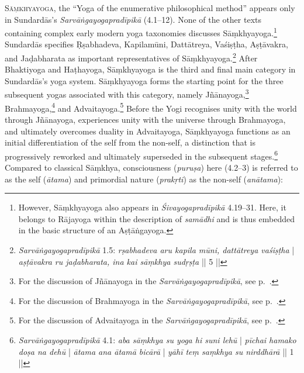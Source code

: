 \lettrine{S}{āṃkhyayoga}, the ``Yoga of the enumerative philosophical method'' appears only in Sundardās's \textit{Sarvāṅgayogapradīpikā} (4.1–12). None of the other texts containing complex early modern yoga taxonomies discusses Sāṃkhyayoga.\footnote{However, Sāṃkhyayoga also appears in \emph{Śivayogapradīpikā} 4.19–31. Here, it belongs to Rājayoga within the description of \textit{samādhi} and is thus embedded in the basic structure of an Aṣṭāṅgayoga.} Sundardās specifies Ṛṣabhadeva, Kapilamūni, Dattātreya, Vaśiṣṭha, Aṣṭāvakra, and Jaḍabharata as important representatives of Sāṃkhyayoga.\footnote{\emph{Sarvāṅgayogapradīpikā} 1.5: \textit{rṣabhadeva aru kapila mūni, dattātreya vaśiṣṭha} | \textit{aṣṭāvakra ru jaḍabharata, ina kai sāṃkhya sudṛṣṭa} || 5 ||} After Bhaktiyoga and Haṭhayoga, Sāṃkhyayoga is the third and final main category in Sundardās's yoga system. Sāṃkhyayoga forms the starting point for the three subsequent yogas associated with this category, namely Jñānayoga,\footnote{For the discussion of Jñānayoga in the \emph{Sarvāṅgayogapradīpikā}, see p.~\pageref{jnanayogaintrocandrika}.} Brahmayoga,\footnote{For the discussion of Brahmayoga in the \emph{Sarvāṅgayogapradīpikā}, see p.~\pageref{sundarbrahma}.} and Advaitayoga.\footnote{For the discussion of Advaitayoga in the \emph{Sarvāṅgayogapradīpikā}, see p.~\pageref{sundaradvaita}.} Before the Yogi recognises unity with the world through Jñānayoga, experiences unity with the universe through Brahmayoga, and ultimately overcomes duality in Advaitayoga, Sāṃkhyayoga functions as an initial differentiation of the self from the non-self, a distinction that is progressively reworked and ultimately superseded in the subsequent stages.\footnote{\emph{Sarvāṅgayogapradīpikā} 4.1: \textit{aba sāṃkhya su yoga hi suni lehū} | \textit{pīchai hamako doṣa na dehū} | \textit{ātama ana ātamā bicārā} | \textit{yāhī teṃ saṃkhya su nirddhārā} || 1 ||} Compared to classical Sāṃkhya, consciousness (\textit{puruṣa}) here (4.2–3) is referred to as the self (\textit{ātama}) and primordial nature (\textit{prakṛti}) as the non-self (\textit{anātama}):

